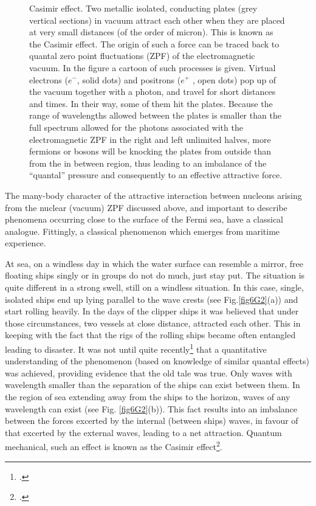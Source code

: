 \begin{subappendices}
\begin{figure}
\caption{Casimir effect. Two metallic isolated, conducting plates (grey vertical sections) in vacuum attract
each other when they are placed at very small distances (of the order of micron). This is known as the
Casimir effect. The origin of such a force can be traced back to quantal zero point fluctuations (ZPF) of the electromagnetic vacuum. In
the figure a cartoon of such processes is given. Virtual electrons ($e^-$, solid dots) and positrons ($e^+$ , open
dots) pop up of the vacuum together with a photon, and travel for short distances and times. In their
way, some of them hit the plates. Because the range of wavelengths allowed between
the plates is smaller than the full spectrum allowed for
the photons associated with the electromagnetic ZPF in the right and left unlimited halves, more fermions
or bosons will be knocking the plates from outside than from the in between region, thus leading to an imbalance of
the ``quantal'' pressure and consequently to an effective attractive force.}\label{fig6G3}
\end{figure}
The many-body character of the attractive interaction between nucleons arising from the nuclear (vacuum) ZPF discussed above, and important to describe phenomena occurring close to the surface of the Fermi sea, have a classical analogue. Fittingly, a classical phenomenon which emerges from maritime experience. 


At sea, on a windless day in which the water surface can resemble a mirror, free floating
ships singly or in groups do not do much, just stay put. The situation is quite different
in a strong swell, still on a windless situation. In this case, single, isolated ships end up
lying parallel to the wave crests (see Fig.\ref{fig6G2}(a)) and start rolling heavily. In the days
of the clipper ships it was believed that under those circumstances, two vessels at close
distance, attracted each other. This in keeping with the fact that the rigs of the rolling
ships became often entangled leading to disaster. It was not until quite recently\footnote{\cite{Boersma:96}.}
that a quantitative understanding of the phenomenon (based on knowledge of similar quantal
effects) was achieved, providing evidence that the old tale was true.
Only waves with wavelength smaller than the separation of the ships can exist between
them. In the region of sea extending away from the ships to the horizon, waves of any
wavelength can exist (see Fig. \ref{fig6G2}(b)). This fact results into an imbalance between the
forces excerted by the internal (between ships) waves, in favour of that excerted by the
external waves, leading to a net attraction.
Quantum mechanical, such an effect is known as the Casimir effect\footnote{\cite{Casimir:48}.}. 



\end{subappendices}
